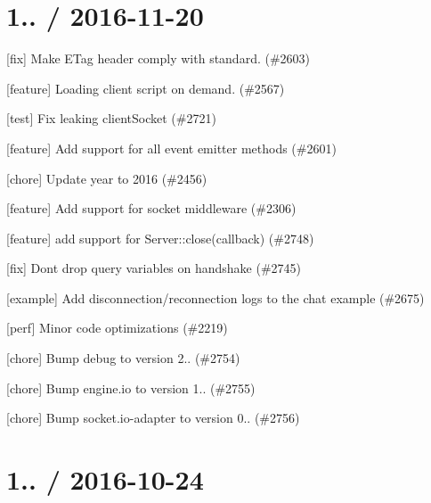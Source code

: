 \section*{1.. / 2016-\/11-\/20 }


\begin{DoxyItemize}
\item \mbox{[}fix\mbox{]} Make E\+Tag header comply with standard. (\#2603)
\item \mbox{[}feature\mbox{]} Loading client script on demand. (\#2567)
\item \mbox{[}test\mbox{]} Fix leaking client\+Socket (\#2721)
\item \mbox{[}feature\mbox{]} Add support for all event emitter methods (\#2601)
\item \mbox{[}chore\mbox{]} Update year to 2016 (\#2456)
\item \mbox{[}feature\mbox{]} Add support for socket middleware (\#2306)
\item \mbox{[}feature\mbox{]} add support for Server\+::close(callback) (\#2748)
\item \mbox{[}fix\mbox{]} Don\textquotesingle{}t drop query variables on handshake (\#2745)
\item \mbox{[}example\mbox{]} Add disconnection/reconnection logs to the chat example (\#2675)
\item \mbox{[}perf\mbox{]} Minor code optimizations (\#2219)
\item \mbox{[}chore\mbox{]} Bump debug to version 2.. (\#2754)
\item \mbox{[}chore\mbox{]} Bump engine.\+io to version 1.. (\#2755)
\item \mbox{[}chore\mbox{]} Bump socket.\+io-\/adapter to version 0.. (\#2756)
\end{DoxyItemize}

\section*{1.. / 2016-\/10-\/24 }


